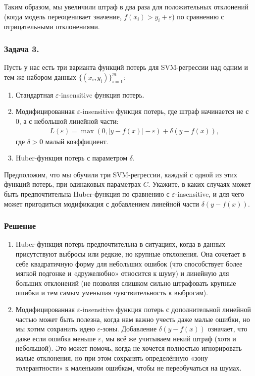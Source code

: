 Таким образом, мы увеличили штраф в два раза для положительных отклонений (когда модель переоценивает значение, \(f(x_i) > y_i +\varepsilon\)) по сравнению с отрицательными отклонениями.

\subsubsection{Задача 3.}
Пусть у нас есть три варианта функций потерь для SVM-регрессии над одним и тем же набором данных \(\{(x_i, y_i)\}_{i=1}^m\):
\begin{enumerate}
    \item Стандартная \(\varepsilon\)-insensitive функция потерь.
    \item Модифицированная \(\varepsilon\)-insensitive функция потерь, где штраф начинается не с \(0\), а с небольшой линейной части: 
    \begin{align*}
        L(\varepsilon) = \max(0, | y - f(x) | - \varepsilon) + \delta(y - f(x)),
    \end{align*}
    где \(\delta > 0\) малый коэффициент.

    \item Huber-функция потерь с параметром \(\delta\).
\end{enumerate}

Предположим, что мы обучили три SVM-регрессии, каждый с одной из этих функций потерь, при одинаковых параметрах \(C\). Укажите, в каких случаях может быть предпочтительна Huber-функция по сравнению с 
\(\varepsilon\)-insensitive, и для чего может пригодиться модификация с добавлением линейной части \(\delta(y - f(x))\).

\subsubsection{Решение}
\begin{enumerate}
    \item Huber-функция потерь предпочтительна в ситуациях, когда в данных присутствуют выбросы или редкие, но крупные отклонения. Она сочетает в себе квадратичную форму для небольших ошибок (что способствует более мягкой подгонке и «дружелюбно» относится к шуму) и линейную для больших отклонений (не позволяя слишком сильно штрафовать крупные ошибки и тем самым уменьшая чувствительность к выбросам).
    \item Модифицированная \(\varepsilon\)-insensitive функция потерь с дополнительной линейной частью может быть полезна, когда нам важно учесть даже малые ошибки, но мы хотим сохранить идею \(\varepsilon\)-зоны. Добавление \(\delta(y - f(x))\) означает, что даже если ошибка меньше \(\varepsilon\), мы всё же учитываем некий штраф (хотя и небольшой). Это может помочь, когда не хочется полностью игнорировать малые отклонения, но при этом сохранять определённую «зону толерантности» к маленьким ошибкам, чтобы не переобучаться на шумах.
\end{enumerate}

